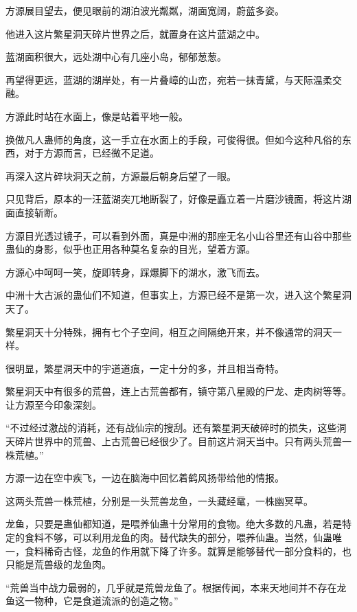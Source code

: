 
\begin{this_body}



方源展目望去，便见眼前的湖泊波光粼粼，湖面宽阔，蔚蓝多姿。

他进入这片繁星洞天碎片世界之后，就置身在这片蓝湖之中。

蓝湖面积很大，远处湖中心有几座小岛，郁郁葱葱。

再望得更远，蓝湖的湖岸处，有一片叠嶂的山峦，宛若一抹青黛，与天际温柔交融。

方源此时站在水面上，像是站着平地一般。

换做凡人蛊师的角度，这一手立在水面上的手段，可俊得很。但如今这种凡俗的东西，对于方源而言，已经微不足道。

再深入这片碎块洞天之前，方源最后朝身后望了一眼。

只见背后，原本的一汪蓝湖突兀地断裂了，好像是矗立着一片磨沙镜面，将这片湖面直接斩断。

方源目光透过镜子，可以看到外面，真是中洲的那座无名小山谷里还有山谷中那些蛊仙的身影，似乎也正用各种莫名复杂的目光，望着方源。

方源心中呵呵一笑，旋即转身，踩爆脚下的湖水，激飞而去。

中洲十大古派的蛊仙们不知道，但事实上，方源已经不是第一次，进入这个繁星洞天了。

繁星洞天十分特殊，拥有七个子空间，相互之间隔绝开来，并不像通常的洞天一样。

很明显，繁星洞天中的宇道道痕，一定十分的多，并且相当奇特。

繁星洞天中有很多的荒兽，连上古荒兽都有，镇守第八星殿的尸龙、走肉树等等。让方源至今印象深刻。

“不过经过激战的消耗，还有战仙宗的搜刮。还有繁星洞天破碎时的损失，这些洞天碎片世界中的荒兽、上古荒兽已经很少了。目前这片洞天当中。只有两头荒兽一株荒植。”

方源一边在空中疾飞，一边在脑海中回忆着鹤风扬带给他的情报。

这两头荒兽一株荒植，分别是一头荒兽龙鱼，一头藏经鼋，一株幽冥草。

龙鱼，只要是蛊仙都知道，是喂养仙蛊十分常用的食物。绝大多数的凡蛊，若是特定的食料不够，可以利用龙鱼的肉。替代缺失的部分，喂养仙蛊。当然，仙蛊唯一，食料稀奇古怪，龙鱼的作用就下降了许多。就算是能够替代一部分食料的，也只能是荒兽级的龙鱼肉。

“荒兽当中战力最弱的，几乎就是荒兽龙鱼了。根据传闻，本来天地间并不存在龙鱼这一物种，它是食道流派的创造之物。”


\end{this_body}
